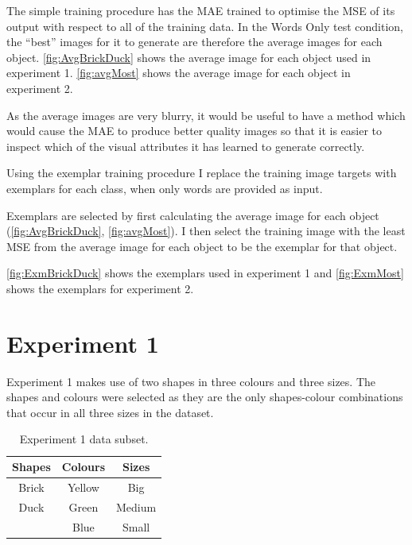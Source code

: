 The simple training procedure has the MAE trained to optimise the MSE of its output with respect to all of the training data. In the Words Only test condition, the ``best'' images for it to generate are therefore the average images for each object. \autoref{fig:AvgBrickDuck} shows the average image for each object used in experiment 1. \autoref{fig:avgMost} shows the average image for each object in experiment 2.

As the average images are very blurry, it would be useful to have a method which would cause the MAE to produce better quality images so that it is easier to inspect which of the visual attributes it has learned to generate correctly.

Using the exemplar training procedure I replace the training image targets with exemplars for each class, when only words are provided as input.

Exemplars are selected by first calculating the average image for each object (\autoref{fig:AvgBrickDuck}, \ref{fig:avgMost}). I then select the training image with the least MSE from the average image for each object to be the exemplar for that object. 

\autoref{fig:ExmBrickDuck} shows the exemplars used in experiment 1 and \autoref{fig:ExmMost} shows the exemplars for experiment 2.



\section{Experiment 1}
Experiment 1 makes use of two shapes in three colours and three sizes. The shapes and colours were selected as they are the only shapes-colour combinations that occur in all three sizes in the dataset.

\begin{table}[h]
\centering
\begin{tabular}{|c|c|c|}
\hline

\textbf{Shapes}  & \textbf{Colours} & \textbf{Sizes}\\ \hline \hline
Brick  & Yellow  & Big \\ \hline
Duck   & Green   & Medium \\ \hline
& Blue & Small \\ \hline
			  
			
\end{tabular}
\caption{Experiment 1 data subset.}
\label{tab:6_exp1_data} 
\end{table}

